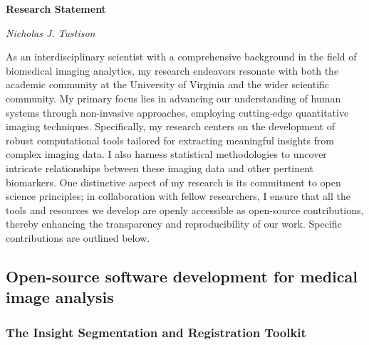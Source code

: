 \documentclass[
  11pt,
]{article}
\author{}
\date{\vspace{-2.5em}}
\begin{document}

\begin{center}
{\Large \bf Research Statement}

{\em Nicholas J. Tustison}
\end{center}

As an interdisciplinary scientist with a comprehensive background in the
field of biomedical imaging analytics, my research endeavors resonate
with both the academic community at the University of Virginia and the
wider scientific community. My primary focus lies in advancing our
understanding of human systems through non-invasive approaches,
employing cutting-edge quantitative imaging techniques. Specifically, my
research centers on the development of robust computational tools
tailored for extracting meaningful insights from complex imaging data. I
also harness statistical methodologies to uncover intricate
relationships between these imaging data and other pertinent biomarkers.
One distinctive aspect of my research is its commitment to open science
principles; in collaboration with fellow researchers, I ensure that all
the tools and resources we develop are openly accessible as open-source
contributions, thereby enhancing the transparency and reproducibility of
our work. Specific contributions are outlined below.

\hypertarget{open-source-software-development-for-medical-image-analysis}{%
\subsection{Open-source software development for medical image
analysis}\label{open-source-software-development-for-medical-image-analysis}}

\hypertarget{the-insight-segmentation-and-registration-toolkit}{%
\subsubsection{The Insight Segmentation and Registration
Toolkit}\label{the-insight-segmentation-and-registration-toolkit}}
\end{document}
